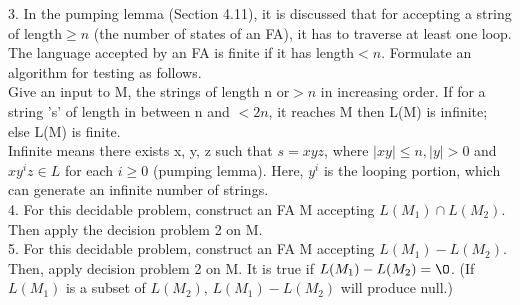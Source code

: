 \documentclass[8pt]{beamer}
\begin{document}
\begin{frame}
\textcolor[rgb]{0.00,0.00,1.00}{3}. In the pumping lemma (Section 4.11), it is discussed that for accepting a string of length$ \geq n$ (the
number of states of an FA), it has to traverse at least one loop. The language accepted by an FA is
finite if it has length$ < n$. Formulate an algorithm for testing as follows.\\
Give an input to M, the strings of length n or$ > n$ in increasing order. If for a string 's' of length in
between n and $< 2n$, it reaches M then L(M) is infinite; else L(M) is finite.\\
Infinite means there exists x, y, z such that $s = xyz$, where $| xy | \leq n, | y | >0$ and $xy^iz \in L$ for each $i \geq 0$
(pumping lemma). Here, $y^i$ is the looping portion, which can generate an infinite number of strings.\\

\textcolor[rgb]{0.00,0.00,1.00}{4}. For this decidable problem, construct an FA M accepting $L(M_1) \cap L(M_2)$. Then apply the decision
problem 2 on M.\\

\textcolor[rgb]{0.00,0.00,1.00}{5}. For this decidable problem, construct an FA M accepting $L(M_1) - L(M_2)$. Then, apply decision
problem 2 on M. It is true if $L(M_1) - L(M_2) = {\O}$. (If $L(M_1)$ is a subset of $L(M_2)$, $L(M_1) - L(M_2)$
will produce null.)\\
\end{frame}
\end{document}
